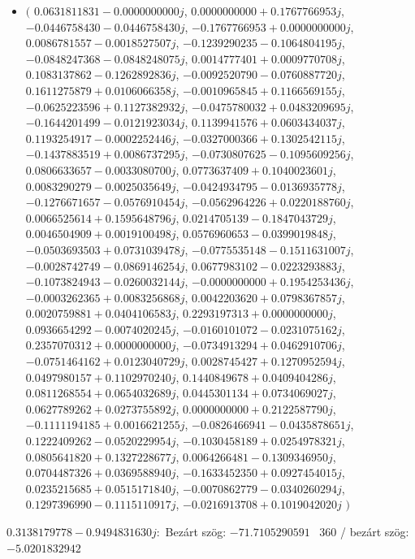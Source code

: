 \documentclass[14pt,a4paper]{article}
\begin{document}
\begin{itemize}
\item
$\big($
$0.0631811831-0.0000000000j$, $0.0000000000+0.1767766953j$, $-0.0446758430-0.0446758430j$, $-0.1767766953+0.0000000000j$, $0.0086781557-0.0018527507j$, $-0.1239290235-0.1064804195j$, $-0.0848247368-0.0848248075j$, $0.0014777401+0.0009770708j$, $0.1083137862-0.1262892836j$, $-0.0092520790-0.0760887720j$, $0.1611275879+0.0106066358j$, $-0.0010965845+0.1166569155j$, $-0.0625223596+0.1127382932j$, $-0.0475780032+0.0483209695j$, $-0.1644201499-0.0121923034j$, $0.1139941576+0.0603434037j$, $0.1193254917-0.0002252446j$, $-0.0327000366+0.1302542115j$, $-0.1437883519+0.0086737295j$, $-0.0730807625-0.1095609256j$, $0.0806633657-0.0033080700j$, $0.0773637409+0.1040023601j$, $0.0083290279-0.0025035649j$, $-0.0424934795-0.0136935778j$, $-0.1276671657-0.0576910454j$, $-0.0562964226+0.0220188760j$, $0.0066525614+0.1595648796j$, $0.0214705139-0.1847043729j$, $0.0046504909+0.0019100498j$, $0.0576960653-0.0399019848j$, $-0.0503693503+0.0731039478j$, $-0.0775535148-0.1511631007j$, $-0.0028742749-0.0869146254j$, $0.0677983102-0.0223293883j$, $-0.1073824943-0.0260032144j$, $-0.0000000000+0.1954253436j$, $-0.0003262365+0.0083256868j$, $0.0042203620+0.0798367857j$, $0.0020759881+0.0404106583j$, $0.2293197313+0.0000000000j$, $0.0936654292-0.0074020245j$, $-0.0160101072-0.0231075162j$, $0.2357070312+0.0000000000j$, $-0.0734913294+0.0462910706j$, $-0.0751464162+0.0123040729j$, $0.0028745427+0.1270952594j$, $0.0497980157+0.1102970240j$, $0.1440849678+0.0409404286j$, $0.0811268554+0.0654032689j$, $0.0445301134+0.0734069027j$, $0.0627789262+0.0273755892j$, $0.0000000000+0.2122587790j$, $-0.1111194185+0.0016621255j$, $-0.0826466941-0.0435878651j$, $0.1222409262-0.0520229954j$, $-0.1030458189+0.0254978321j$, $0.0805641820+0.1327228677j$, $0.0064266481-0.1309346950j$, $0.0704487326+0.0369588940j$, $-0.1633452350+0.0927454015j$, $0.0235215685+0.0515171840j$, $-0.0070862779-0.0340260294j$, $0.1297396990-0.1115110917j$, $-0.0216913708+0.1019042020j$
$\big)$
\end{itemize}
$0.3138179778-0.9494831630j$:\
Bezárt szög: $-71.7105290591$ \
360 / bezárt szög: $-5.0201832942$\
\end{document}
